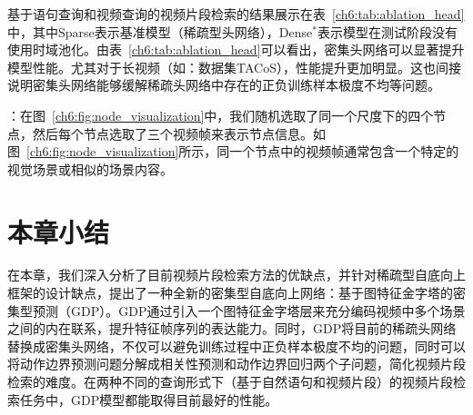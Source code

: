 基于语句查询和视频查询的视频片段检索的结果展示在表~\ref{ch6:tab:ablation_head}中，其中Sparse表示基准模型（稀疏型头网络），Dense$^*$表示模型在测试阶段没有使用时域池化。由表~\ref{ch6:tab:ablation_head}可以看出，密集头网络可以显著提升模型性能。尤其对于长视频（如：数据集TACoS），性能提升更加明显。这也间接说明密集头网络能够缓解稀疏头网络中存在的正负训练样本极度不均等问题。


\textbf{}：在图~\ref{ch6:fig:node_visualization}中，我们随机选取了同一个尺度下的四个节点，然后每个节点选取了三个视频帧来表示节点信息。如图~\ref{ch6:fig:node_visualization}所示，同一个节点中的视频帧通常包含一个特定的视觉场景或相似的场景内容。

\section{本章小结}
在本章，我们深入分析了目前视频片段检索方法的优缺点，并针对稀疏型自底向上框架的设计缺点，提出了一种全新的密集型自底向上网络：基于图特征金字塔的密集型预测（GDP）。GDP通过引入一个图特征金字塔层来充分编码视频中多个场景之间的内在联系，提升特征帧序列的表达能力。同时，GDP将目前的稀疏头网络替换成密集头网络，不仅可以避免训练过程中正负样本极度不均的问题，同时可以将动作边界预测问题分解成相关性预测和动作边界回归两个子问题，简化视频片段检索的难度。在两种不同的查询形式下（基于自然语句和视频片段）的视频片段检索任务中，GDP模型都能取得目前最好的性能。
